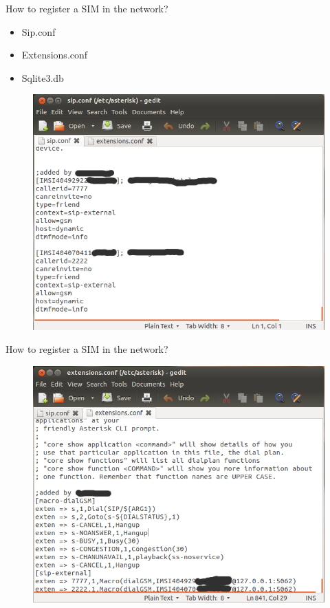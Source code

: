 \documentclass{beamer}
\begin{document}
  \begin{frame}{How to register a SIM in the network?}
    \begin{itemize}
      \item Sip.conf
      \item Extensions.conf
      \item Sqlite3.db
    \end{itemize}
    \begin{figure}
      \centering
      \includegraphics[width=0.7\linewidth]{img/sip_conf}
    \end{figure}
  \end{frame}
  
  \begin{frame}{How to register a SIM in the network?}
    \begin{figure}
      \centering
      \includegraphics[width=0.7\linewidth]{img/ext_conf}
    \end{figure}
  \end{frame}
  
\end{document}
